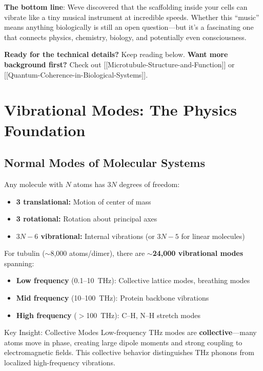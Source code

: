\textbf{The bottom line}: We\textquotesingle ve discovered that the
scaffolding inside your cells can vibrate like a tiny musical instrument
at incredible speeds. Whether this ``music'' means anything biologically
is still an open question---but it's a fascinating
one that connects physics, chemistry, biology, and potentially even
consciousness.

\textbf{Ready for the technical details?} Keep reading below.
\textbf{Want more background first?} Check out
{[}{[}Microtubule-Structure-and-Function{]}{]} or
{[}{[}Quantum-Coherence-in-Biological-Systems{]}{]}.

\section{Vibrational Modes: The Physics Foundation}
\label{sec:vibrational-modes}

\subsection{Normal Modes of Molecular Systems}
\label{subsec:normal-modes}

Any molecule with $N$ atoms has $3N$ degrees of freedom:
\begin{itemize}
\item \textbf{3 translational:} Motion of center of mass
\item \textbf{3 rotational:} Rotation about principal axes  
\item \textbf{$3N - 6$ vibrational:} Internal vibrations (or $3N - 5$ for linear molecules)
\end{itemize}

For tubulin ($\sim$8,000 atoms/dimer), there are \textbf{$\sim$24,000 vibrational modes} spanning:
\begin{itemize}
\item \textbf{Low frequency} (0.1--10~THz): Collective lattice modes, breathing modes
\item \textbf{Mid frequency} (10--100~THz): Protein backbone vibrations
\item \textbf{High frequency} ($>$100~THz): C--H, N--H stretch modes
\end{itemize}

\begin{calloutbox}{Key Insight: Collective Modes}
Low-frequency THz modes are \textbf{collective}---many atoms move in phase, creating large dipole moments and strong coupling to electromagnetic fields. This collective behavior distinguishes THz phonons from localized high-frequency vibrations.
\end{calloutbox}

